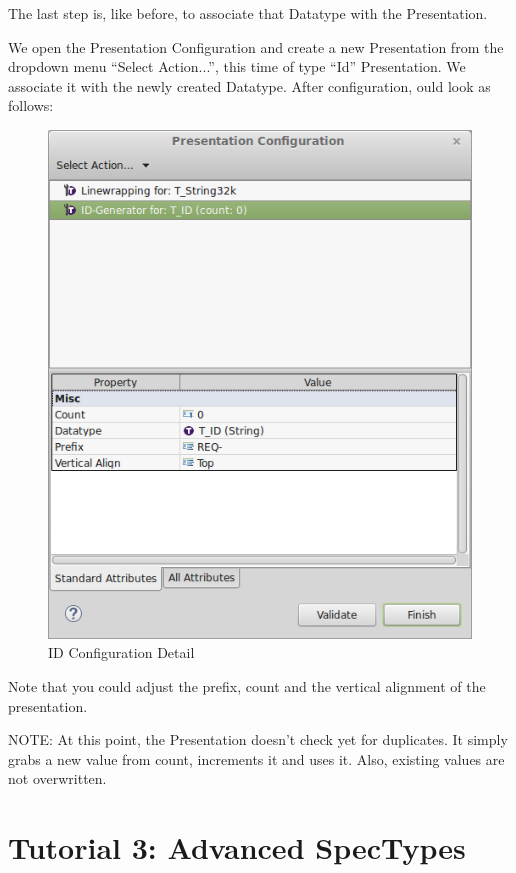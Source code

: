 The last step is, like before, to associate that Datatype with the Presentation.

We open the Presentation Configuration and create a new Presentation from the dropdown menu ``Select Action...'', this time of type ``Id'' Presentation.  We associate it with the newly created Datatype.  After configuration, ould look as follows:

\begin{figure}[h!]
\centering      
\includegraphics[width=0.8\linewidth]{../rmf-images/presentation_id.png}      
\caption{ID Configuration Detail}      
\label{fig:idConfig}
\end{figure}

Note that you could adjust the prefix, count and the vertical alignment of the presentation.

NOTE: At this point, the Presentation doesn't check yet for duplicates.  It simply grabs a new value from count, increments it and uses it.  Also, existing values are not overwritten.

\section{Tutorial 3: Advanced SpecTypes}

